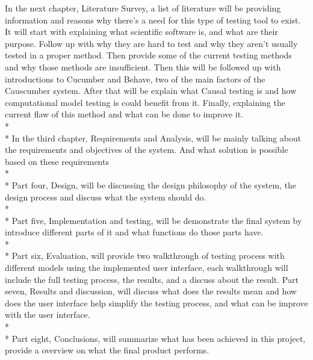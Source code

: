 In the next chapter, Literature Survey, a list of literature will be providing information and reasons why there’s a need for this type of testing tool to exist. It will start with explaining what scientific software is, and what are their purpose. Follow up with why they are hard to test and why they aren’t usually tested in a proper method. Then provide some of the current testing methods and why those methods are insufficient. Then this will be followed up with introductions to Cucumber and Behave, two of the main factors of the Causcumber system. After that will be explain what Causal testing is and how computational model testing is could benefit from it. Finally, explaining the current flaw of this method and what can be done to improve it.\\* \\* 
In the third chapter, Requirements and Analysis, will be mainly talking about the requirements and objectives of the system. And what solution is possible based on these requirements\\* \\*
Part four, Design, will be discussing the design philosophy of the system, the design process and discuss what the system should do. \\* \\*
Part five, Implementation and testing, will be demonstrate the final system by introduce different parts of it and what functions do those parts have. \\* \\*
Part six, Evaluation, will provide two walkthrough of testing process with different models using the implemented user interface, each walkthrough will include the full testing process, the results, and a discuss about the result.
Part seven, Results and discussion, will discuss what does the results mean and how does the user interface help simplify the testing process, and what can be improve with the user interface.\\* \\*
Part eight, Conclusions, will summarize what has been achieved in this project, provide a overview on what the final product performs.






